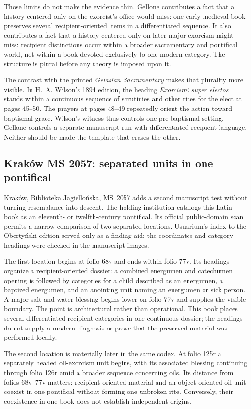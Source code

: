 Those limits do not make the evidence thin. Gellone contributes a fact that a
history centered only on the exorcist's office would miss: one early medieval
book preserves several recipient-oriented items in a differentiated sequence.
It also contributes a fact that a history centered only on later major
exorcism might miss: recipient distinctions occur within a broader
sacramentary and pontifical world, not within a book devoted exclusively to
one modern category. The structure is plural before any theory is imposed
upon it.

The contrast with the printed \emph{Gelasian Sacramentary} makes that plurality
more visible. In H.~A. Wilson's 1894 edition, the heading \emph{Exorcismi super
electos} stands within a continuous sequence of scrutinies and other rites for
the elect at pages 45--50. The prayers at pages 48--49 repeatedly orient the
action toward baptismal grace. Wilson's witness thus controls one
pre-baptismal setting. Gellone controls a separate manuscript run with
differentiated recipient language. Neither should be made the template that
erases the other.

\subsection{Kraków MS 2057: separated units in one pontifical}

Kraków, Biblioteka Jagiellońska, MS~2057 adds a second manuscript test without
turning resemblance into descent. The holding institution catalogs this Latin
book as an eleventh- or twelfth-century pontifical. Its official
public-domain scan permits a narrow comparison of two separated locations.
Usuarium's index to the Obertyński edition served only as a finding aid; the
coordinates and category headings were checked in the manuscript images.

The first location begins at folio 68v and ends within folio 77v. Its headings
organize a recipient-oriented dossier: a combined energumen and catechumen
opening is followed by categories for a child described as an energumen, a
baptized energumen, and an anointing unit naming an energumen or sick person.
A major salt-and-water blessing begins lower on folio 77v and supplies the
visible boundary. The point is architectural rather than operational. This
book places several differentiated recipient categories in one continuous
dossier; the headings do not supply a modern diagnosis or prove that the
preserved material was performed locally.

The second location is materially later in the same codex. At folio 125r a
separately headed oil-exorcism unit begins, with its associated blessing
continuing through folio 126r amid a broader sequence concerning oils. Its
distance from folios 68v--77v matters: recipient-oriented material and an
object-oriented oil unit coexist in one pontifical without forming one
unbroken rite. Conversely, their coexistence in one book does not establish
independent origins.

